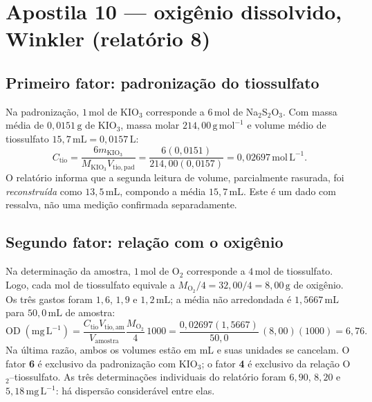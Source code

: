 \documentclass[11pt,a4paper]{article}
\newcommand{\molL}{\mathrm{mol\,L^{-1}}}
\newcommand{\mgL}{\mathrm{mg\,L^{-1}}}
\newcommand{\mL}{\mathrm{mL}}
\begin{document}
\section{Apostila 10 --- oxigênio dissolvido, Winkler (relatório 8)}
\subsection*{Primeiro fator: padronização do tiossulfato}
Na padronização, $1\,\mathrm{mol}$ de KIO$_3$ corresponde a $6\,\mathrm{mol}$ de Na$_2$S$_2$O$_3$. Com massa média de $0{,}0151\,\mathrm{g}$ de KIO$_3$, massa molar $214{,}00\,\mathrm{g\,mol^{-1}}$ e volume médio de tiossulfato $15{,}7\,\mL=0{,}0157\,\mathrm{L}$:
\begin{equation}
C_{\mathrm{tio}}=\frac{6m_{\mathrm{KIO_3}}}{M_{\mathrm{KIO_3}}V_{\mathrm{tio,pad}}}
=\frac{6(0{,}0151)}{214{,}00(0{,}0157)}
=0{,}02697\,\molL.
\end{equation}
O relatório informa que a segunda leitura de volume, parcialmente rasurada, foi \emph{reconstruída} como $13{,}5\,\mL$, compondo a média $15{,}7\,\mL$. Este é um dado com ressalva, não uma medição confirmada separadamente.

\subsection*{Segundo fator: relação com o oxigênio}
Na determinação da amostra, $1\,\mathrm{mol}$ de O$_2$ corresponde a $4\,\mathrm{mol}$ de tiossulfato. Logo, cada mol de tiossulfato equivale a $M_{\mathrm{O_2}}/4=32{,}00/4=8{,}00\,\mathrm{g}$ de oxigênio. Os três gastos foram $1{,}6$, $1{,}9$ e $1{,}2\,\mL$; a média não arredondada é $1{,}5667\,\mL$ para $50{,}0\,\mL$ de amostra:
\begin{equation}
\mathrm{OD}\;(\mgL)
=\frac{C_{\mathrm{tio}}V_{\mathrm{tio,am}}}{V_{\mathrm{amostra}}}
\frac{M_{\mathrm{O_2}}}{4}\,1000
=\frac{0{,}02697(1{,}5667)}{50{,}0}\,(8{,}00)(1000)
=6{,}76.
\end{equation}
Na última razão, ambos os volumes estão em mL e suas unidades se cancelam. O fator \textbf{6} é exclusivo da padronização com KIO$_3$; o fator \textbf{4} é exclusivo da relação O$_2$--tiossulfato. As três determinações individuais do relatório foram $6{,}90$, $8{,}20$ e $5{,}18\,\mgL$: há dispersão considerável entre elas.
\end{document}
